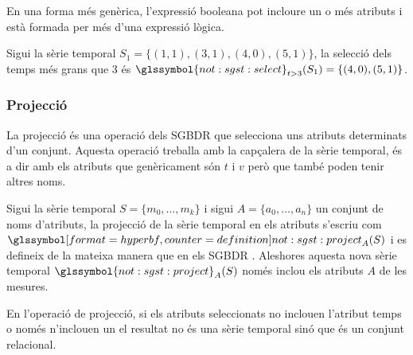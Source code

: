 En una forma més genèrica, l'expressió booleana pot incloure un o més
atributs i està formada per més d'una expressió lògica.


\begin{example}
  Sigui la sèrie temporal $S_1=\{(1,1),(3,1),(4,0),(5,1)\}$, la
  selecció dels temps més grans que $3$ és
  $\glssymbol{not:sgst:select}_{t>3}(S_1) = \{(4,0),(5,1)\}$.
\end{example}





\subsubsection{Projecció}


La projecció és una operació dels \gls{SGBDR} que selecciona uns
atributs determinats d'un conjunt. Aquesta operació treballa amb la
capçalera de la sèrie temporal, és a dir amb els atributs que
genèricament són $t$ i $v$ però que també poden tenir altres noms.

\begin{definition}[projecció]
  Sigui la sèrie temporal $S=\{ m_0,\dotsc,m_k\}$ i sigui $A=\{a_0,
  \dotsc, a_n\}$ un conjunt de noms d'atributs, la projecció de la
  sèrie temporal en els atributs s'escriu com
  $\glssymboldef{not:sgst:project}_A(S)$ i es defineix de la mateixa
  manera que en els
  \gls{SGBDR} \parencite[cap.~7]{date04:introduction8}. Aleshores
  aquesta nova sèrie temporal $\glssymbol{not:sgst:project}_A(S)$
  només inclou els atributs $A$ de les mesures.
\end{definition}

En l'operació de projecció, si els
atributs seleccionats no inclouen l'atribut temps o només n'inclouen
un el resultat no és una sèrie temporal sinó que és un conjunt
relacional. 






